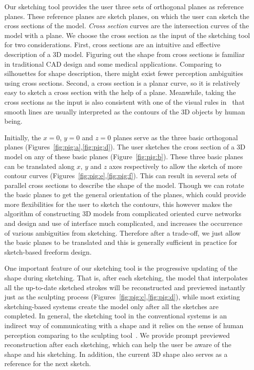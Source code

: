 Our sketching tool provides the user three sets of orthogonal planes
as reference planes. These reference planes are sketch planes, on
which the user can sketch the cross sections of the model.
\textit{Cross section} curves are the intersection curves of the
model with a plane. We choose the cross section as the input of the
sketching tool for two considerations. First, cross sections are an
intuitive and effective description of a 3D model. Figuring out the
shape from cross sections is familiar in traditional CAD design and
some medical applications. Comparing to silhouettes for shape
description, there might exist fewer perception ambiguities using
cross sections. Second, a cross section is a planar curve, so it is
relatively easy to sketch a cross section with the help of a plane.
Meanwhile, taking the cross sections as the input is also consistent 
with one of the visual rules in~\cite{HD00} that smooth lines are 
usually interpreted as the contours of the 3D objects by human being.

Initially, the $x=0$, $y=0$ and $z=0$ planes serve as the three
basic orthogonal planes (Figures~\ref{fig:pig:a},\ref{fig:pig:d}).
The user sketches the cross section of a 3D model on any of these
basic planes (Figure~\ref{fig:pig:b}). These three basic planes can
be translated along $x$, $y$ and $z$ axes respectively to allow the
sketch of more contour curves
(Figures~\ref{fig:pig:e},\ref{fig:pig:f}). This can result in
several sets of parallel cross sections to describe the shape of the
model. Though we can rotate the basic planes to get the general
orientation of the planes, which could provide more flexibilities
for the user to sketch the contours, this however makes the
algorithm of constructing 3D models from complicated oriented curve
networks and design and use of interface much complicated, and
increases the occurrence of various ambiguities from sketching.
Therefore after a trade-off, we just allow the basic planes to be
translated and this is generally sufficient in practice for
sketch-based freeform design.

One important feature of our sketching tool is the progressive
updating of the shape during sketching. That is, after each
sketching, the model that interpolates all the up-to-date sketched
strokes will be reconstructed and previewed instantly just as the
sculpting process (Figures~\ref{fig:pig:c},\ref{fig:pig:d}), while
most existing sketching-based systems create the model only after
all the sketches are completed. In general, the sketching tool in
the conventional systems is an indirect way of communicating with a
shape and it relies on the sense of human perception comparing to
the sculpting tool~\cite{CIW08}. We provide prompt previewed
reconstruction after each sketching, which can help the user be
aware of the shape and his sketching. In addition, the current 3D
shape also serves as a reference for the next sketch.


